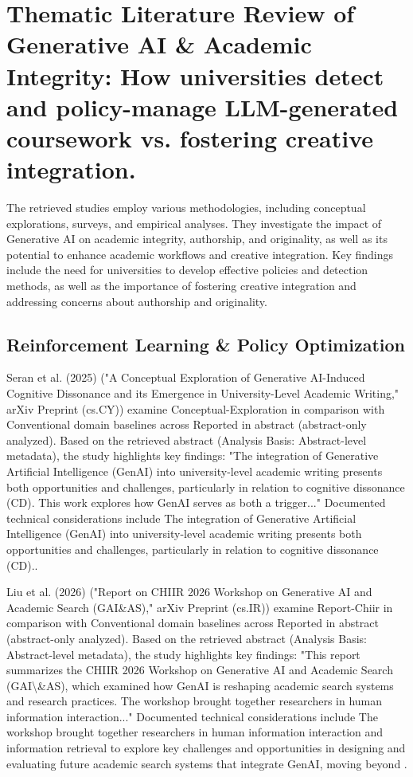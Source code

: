 \documentclass[10pt,twocolumn,letterpaper]{article}
\begin{document}
\section{Thematic Literature Review of Generative AI \& Academic Integrity: How universities detect and policy-manage LLM-generated coursework vs. fostering creative integration.}
The retrieved studies employ various methodologies, including conceptual explorations, surveys, and empirical analyses. They investigate the impact of Generative AI on academic integrity, authorship, and originality, as well as its potential to enhance academic workflows and creative integration. Key findings include the need for universities to develop effective policies and detection methods, as well as the importance of fostering creative integration and addressing concerns about authorship and originality.

\subsection{Reinforcement Learning \& Policy Optimization}
Seran et al. (2025) \cite{ref1} ("A Conceptual Exploration of Generative AI-Induced Cognitive Dissonance and its Emergence in University-Level Academic Writing," arXiv Preprint (cs.CY)) examine Conceptual-Exploration in comparison with Conventional domain baselines across Reported in abstract (abstract-only analyzed). Based on the retrieved abstract (Analysis Basis: Abstract-level metadata), the study highlights key findings: "The integration of Generative Artificial Intelligence (GenAI) into university-level academic writing presents both opportunities and challenges, particularly in relation to cognitive dissonance (CD). This work explores how GenAI serves as both a trigger..." Documented technical considerations include The integration of Generative Artificial Intelligence (GenAI) into university-level academic writing presents both opportunities and challenges, particularly in relation to cognitive dissonance (CD)..

Liu et al. (2026) \cite{ref4} ("Report on CHIIR 2026 Workshop on Generative AI and Academic Search (GAI\&AS)," arXiv Preprint (cs.IR)) examine Report-Chiir in comparison with Conventional domain baselines across Reported in abstract (abstract-only analyzed). Based on the retrieved abstract (Analysis Basis: Abstract-level metadata), the study highlights key findings: "This report summarizes the CHIIR 2026 Workshop on Generative AI and Academic Search (GAI\textbackslash{}\&AS), which examined how GenAI is reshaping academic search systems and research practices. The workshop brought together researchers in human information interaction..." Documented technical considerations include The workshop brought together researchers in human information interaction and information retrieval to explore key challenges and opportunities in designing and evaluating future academic search systems that integrate GenAI, moving beyond .
\end{document}
